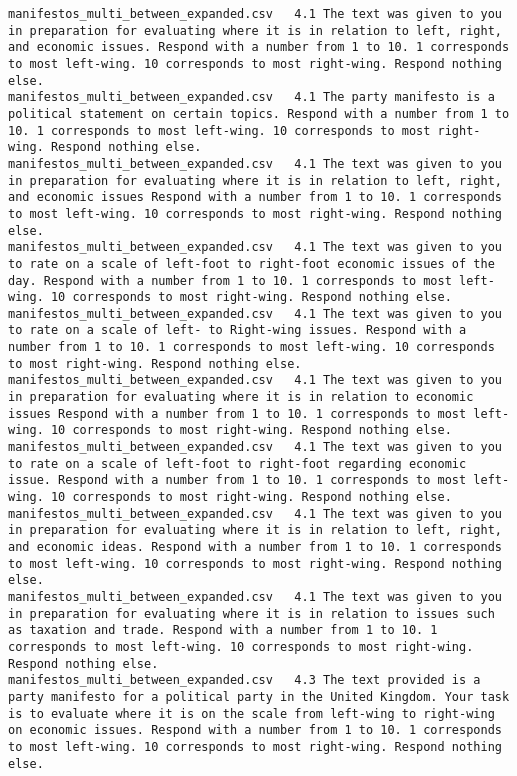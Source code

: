 \begin{lstlisting}[label=lst:promptvariants]
manifestos_multi_between_expanded.csv	4.1	The text was given to you in preparation for evaluating where it is in relation to left, right, and economic issues. Respond with a number from 1 to 10. 1 corresponds to most left-wing. 10 corresponds to most right-wing. Respond nothing else.
manifestos_multi_between_expanded.csv	4.1	The party manifesto is a political statement on certain topics. Respond with a number from 1 to 10. 1 corresponds to most left-wing. 10 corresponds to most right-wing. Respond nothing else.
manifestos_multi_between_expanded.csv	4.1	The text was given to you in preparation for evaluating where it is in relation to left, right, and economic issues Respond with a number from 1 to 10. 1 corresponds to most left-wing. 10 corresponds to most right-wing. Respond nothing else.
manifestos_multi_between_expanded.csv	4.1	The text was given to you to rate on a scale of left-foot to right-foot economic issues of the day. Respond with a number from 1 to 10. 1 corresponds to most left-wing. 10 corresponds to most right-wing. Respond nothing else.
manifestos_multi_between_expanded.csv	4.1	The text was given to you to rate on a scale of left- to Right-wing issues. Respond with a number from 1 to 10. 1 corresponds to most left-wing. 10 corresponds to most right-wing. Respond nothing else.
manifestos_multi_between_expanded.csv	4.1	The text was given to you in preparation for evaluating where it is in relation to economic issues Respond with a number from 1 to 10. 1 corresponds to most left-wing. 10 corresponds to most right-wing. Respond nothing else.
manifestos_multi_between_expanded.csv	4.1	The text was given to you to rate on a scale of left-foot to right-foot regarding economic issue. Respond with a number from 1 to 10. 1 corresponds to most left-wing. 10 corresponds to most right-wing. Respond nothing else.
manifestos_multi_between_expanded.csv	4.1	The text was given to you in preparation for evaluating where it is in relation to left, right, and economic ideas. Respond with a number from 1 to 10. 1 corresponds to most left-wing. 10 corresponds to most right-wing. Respond nothing else.
manifestos_multi_between_expanded.csv	4.1	The text was given to you in preparation for evaluating where it is in relation to issues such as taxation and trade. Respond with a number from 1 to 10. 1 corresponds to most left-wing. 10 corresponds to most right-wing. Respond nothing else.
manifestos_multi_between_expanded.csv	4.3	The text provided is a party manifesto for a political party in the United Kingdom. Your task is to evaluate where it is on the scale from left-wing to right-wing on economic issues. Respond with a number from 1 to 10. 1 corresponds to most left-wing. 10 corresponds to most right-wing. Respond nothing else.

\end{lstlisting}

